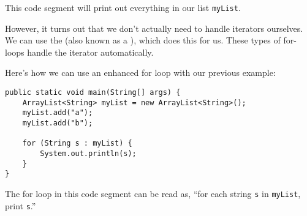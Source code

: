 This code segment will print out everything in our list \verb!myList!. 

However, it turns out that we don't actually need to handle iterators ourselves. We can use the  (also known as a ), which does this for us. These types of for-loops handle the iterator automatically. 

Here's how we can use an enhanced for loop with our previous example:


\begin{lstlisting}
public static void main(String[] args) {
    ArrayList<String> myList = new ArrayList<String>();
    myList.add("a");
    myList.add("b");
    
    for (String s : myList) {
        System.out.println(s);
    }
}
\end{lstlisting}

The for loop in this code segment can be read as, ``for each string \verb!s! in \verb!myList!, print \verb!s!.''